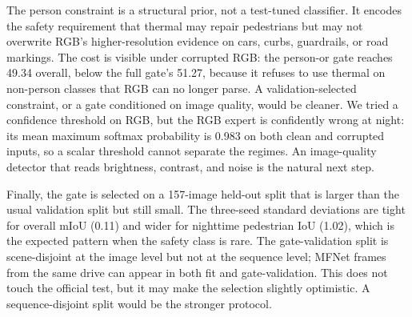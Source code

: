 The person constraint is a structural prior, not a test-tuned classifier. It encodes
the safety requirement that thermal may repair pedestrians but may not overwrite RGB's
higher-resolution evidence on cars, curbs, guardrails, or road markings. The cost is
visible under corrupted RGB: the person-or gate reaches 49.34 overall, below the full
gate's 51.27, because it refuses to use thermal on non-person classes that RGB can no
longer parse. A validation-selected constraint, or a gate conditioned on image quality,
would be cleaner. We tried a confidence threshold on RGB, but the RGB expert is
confidently wrong at night: its mean maximum softmax probability is 0.983 on both clean
and corrupted inputs, so a scalar threshold cannot separate the regimes. An
image-quality detector that reads brightness, contrast, and noise is the natural next
step.

Finally, the gate is selected on a 157-image held-out split that is larger than the
usual validation split but still small. The three-seed standard deviations are tight
for overall mIoU (0.11) and wider for nighttime pedestrian IoU (1.02), which is the
expected pattern when the safety class is rare. The gate-validation split is
scene-disjoint at the image level but not at the sequence level; MFNet frames from the
same drive can appear in both fit and gate-validation. This does not touch the official
test, but it may make the selection slightly optimistic. A sequence-disjoint split
would be the stronger protocol.
